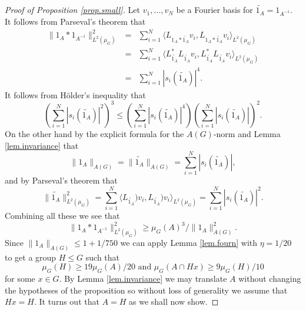 \documentclass[12pt]{amsart}
\numberwithin{equation}{section}
\theoremstyle{plain}
\theoremstyle{definition}
\renewcommand{\leq}{\leqslant}
\renewcommand{\geq}{\geqslant}
\begin{document}
\begin{proof}[Proof of Proposition \ref{prop.small}]
Let $v_1,\dots,v_N$ be a Fourier basis for $\widetilde{1_A}=1_{A^{-1}}$.  It follows from Parseval's theorem that
\begin{eqnarray*}
\|1_A \ast 1_{A^{-1}}\|_{L^2(\mu_G)}^2 & = & \sum_{i=1}^N{\langle L_{1_A\ast\widetilde{1_A}}v_i,L_{1_A\ast\widetilde{1_A}}v_i\rangle_{L^2(\mu_G)}}\\ & = &  \sum_{i=1}^N{\langle L_{\widetilde{1_A}}^*L_{\widetilde{1_A}}v_i,L_{\widetilde{1_A}}^*L_{\widetilde{1_A}}v_i\rangle_{L^2(\mu_G)}}\\ &= & \sum_{i=1}^N{|s_i(\widetilde{1_A})|^4}.
\end{eqnarray*}
It follows from H{\"o}lder's inequality that
\begin{equation*}
\left(\sum_{i=1}^N{|s_i(\widetilde{1_A})|^2}\right)^3 \leq \left(\sum_{i=1}^N{|s_i(\widetilde{1_A})|^4}\right)\left(\sum_{i=1}^N{|s_i(\widetilde{1_A})|}\right)^2.
\end{equation*}
On the other hand by the explicit formula for the $A(G)$-norm and Lemma \ref{lem.invariance} that
\begin{equation*}
\|1_A\|_{A(G)} =\|\widetilde{1_A}\|_{A(G)}= \sum_{i=1}^N{|s_i(\widetilde{1_A})|},
\end{equation*}
and by Parseval's theorem that
\begin{equation*}
\|\widetilde{1_A}\|_{L^2(\mu_G)}^2 = \sum_{i=1}^N{\langle L_{\widetilde{1_A}})v_i,L_{\widetilde{1_A}})v_i\rangle_{L^2(\mu_G)}}=\sum_{i=1}^N{|s_i(\widetilde{1_A})|^2}.
\end{equation*}
Combining all these we see that
\begin{equation*}
\|1_A \ast 1_{A^{-1}}\|_{L^2(\mu_G)}^2 \geq \mu_G(A)^3/\|1_A\|_{A(G)}^2.
\end{equation*}
Since $\|1_A\|_{A(G)} \leq 1+1/750$ we can apply Lemma \ref{lem.fourn} with $\eta=1/20$ to get a group $H \leq G$ such that
\begin{equation*}
\mu_G(H) \geq 19\mu_G(A)/20 \textrm{ and } \mu_G(A \cap Hx) \geq 9\mu_G(H)/10
\end{equation*}
 for some $x \in G$.  By Lemma \ref{lem.invariance} we may translate $A$ without changing the hypotheses of the proposition so without loss of generality we assume that $Hx=H$. It turns out that $A=H$ as we shall now show.


\end{proof}
\end{document}
